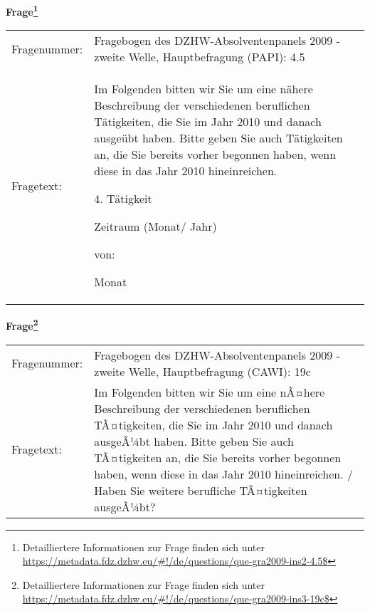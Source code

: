 				\vspace*{0.5cm}
                \noindent\textbf{Frage\footnote{Detailliertere Informationen zur Frage finden sich unter
		              \url{https://metadata.fdz.dzhw.eu/\#!/de/questions/que-gra2009-ins2-4.5$}}}\\
				\begin{tabularx}{\hsize}{@{}lX}
					Fragenummer: &
					  Fragebogen des DZHW-Absolventenpanels 2009 - zweite Welle, Hauptbefragung (PAPI):
					  4.5
 \\
					Fragetext: & Im Folgenden bitten wir Sie um eine nähere Beschreibung der verschiedenen beruflichen Tätigkeiten, die Sie im Jahr 2010 und danach ausgeübt haben. Bitte geben Sie auch Tätigkeiten an, die Sie bereits vorher begonnen haben, wenn diese in das Jahr 2010 hineinreichen.\par  4. Tätigkeit\par  Zeitraum (Monat/ Jahr)\par  von:\par  Monat \\
				\end{tabularx}
				\vspace*{0.5cm}
                \noindent\textbf{Frage\footnote{Detailliertere Informationen zur Frage finden sich unter
		              \url{https://metadata.fdz.dzhw.eu/\#!/de/questions/que-gra2009-ins3-19c$}}}\\
				\begin{tabularx}{\hsize}{@{}lX}
					Fragenummer: &
					  Fragebogen des DZHW-Absolventenpanels 2009 - zweite Welle, Hauptbefragung (CAWI):
					  19c
 \\
					Fragetext: & Im Folgenden bitten wir Sie um eine nÃ¤here Beschreibung der verschiedenen beruflichen TÃ¤tigkeiten, die Sie im Jahr 2010 und danach ausgeÃ¼bt haben. Bitte geben Sie auch TÃ¤tigkeiten an, die Sie bereits vorher begonnen haben, wenn diese in das Jahr 2010 hineinreichen. / Haben Sie weitere berufliche TÃ¤tigkeiten ausgeÃ¼bt? \\
				\end{tabularx}





